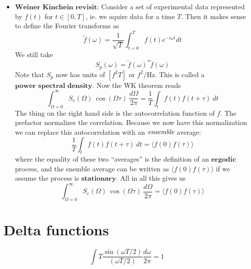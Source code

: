 \documentclass{article}
\begin{document}
\begin{itemize}
\item $\textbf{Weiner Kinchein revisit:}$ Consider a set of experimental data
represented by $f(t)$ for $t\in[0,T]$, ie. we aquire data for a
time $T$. Then it makes sense to define the Fourier transforms as\[
\tilde{f}(\omega)=\frac{1}{\sqrt{T}}\int_{t=0}^{T}f(t)e^{-i\omega t}dt\]
 We still take\[
S_{p}(\omega)=\tilde{f}(\omega)^{*}\tilde{f}(\omega)\]
 Note that $S_{p}$ now has units of $[f^{2}T]$ or $f^{2}/\textrm{Hz}$.
This is called a $\textbf{power spectral density}$. Now the WK theorem
reads\[
\int_{\Omega=0}^{\infty}S_{e}(\Omega)\:\cos\left(\Omega\tau\right)\:\frac{d\Omega}{2\pi}=\frac{1}{T}\int_{t}f(t)f(t+\tau)\: dt\]
 The thing on the right hand side is the autocorrelation function
of $f$. The prefactor normalizes the correlation. Because we now
have this normalization we can replace this autocorrelation with an
$\emph{ensemble}$ average:\[
\frac{1}{T}\int_{t}f(t)f(t+\tau)\: dt=\langle f(0)f(\tau)\rangle\]
 where the equality of these two {}``averages'' is the definition
of an $\textbf{ergodic}$ process, and the enemble average can be
written as $\langle f(0)f(\tau)\rangle$ if we assume the process
is $\textbf{stationary}$. All in all this gives us\[
\int_{\Omega=0}^{\infty}S_{e}(\Omega)\:\cos\left(\Omega\tau\right)\:\frac{d\Omega}{2\pi}=\langle f(0)f(\tau)\rangle\]

\end{itemize}

\section{Delta functions}

\begin{equation}
\int T \frac{\sin \left( \omega T / 2 \right)}{\left( \omega T / 2 \right)} \frac{d\omega}{2\pi} = 1 \end{equation}
\end{document}
